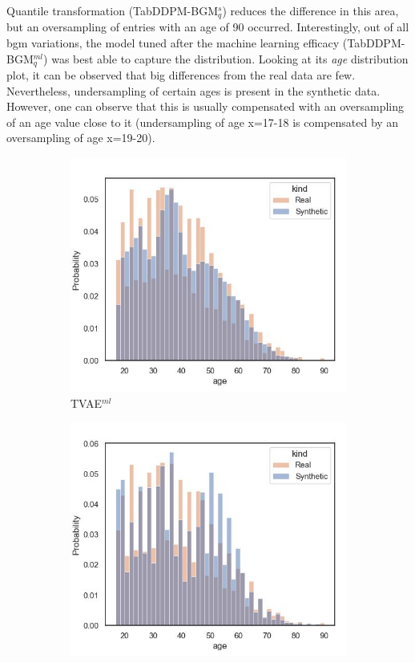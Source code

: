 Quantile transformation (TabDDPM-BGM$^{s}_q$) reduces the difference in this area, but an oversampling of entries with an age of 90 occurred.
Interestingly, out of all \gls{bgm} variations, the model tuned after the machine learning efficacy (TabDDPM-BGM$^{ml}_q$) was best able to capture the distribution.
Looking at its \textit{age} distribution plot, it can be observed that big differences from the real data are few.
Nevertheless, undersampling of certain ages is present in the synthetic data.
However, one can observe that this is usually compensated with an oversampling of an age value close to it
(\eg undersampling of age x=17-18 is compensated by an oversampling of age x=19-20).\newpage


\begin{figure}[H]
	\centering
	\begin{subfigure}{0.3\textwidth}
		\centering
		\includegraphics[width=\textwidth]{images/dist_age/tvae.jpg}
		\caption{TVAE$^{ml}$}
	\end{subfigure}
	\begin{subfigure}{0.3\textwidth}
		\centering
		\includegraphics[width=\textwidth]{images/dist_age/ctabgan.jpg}

\end{subfigure}
\end{figure}
